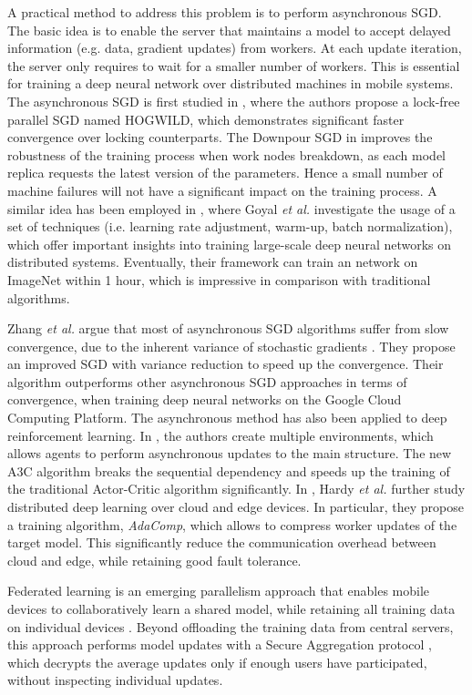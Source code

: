 \documentclass[journal,comsoc,letter]{IEEEtran}
\begin{document}
A practical method to address this problem is to perform asynchronous SGD. The basic idea is to enable the server that maintains a model to accept delayed information (e.g. data, gradient updates) from workers. At each update iteration, the server only requires to wait for a smaller number of workers. This is essential for training a deep neural network over distributed machines in mobile systems. The asynchronous SGD is first studied in \cite{recht2011hogwild}, where the authors propose a lock-free parallel SGD named HOGWILD, which demonstrates significant faster convergence over locking counterparts. The Downpour SGD in \cite{dean2012large} improves the robustness of the training process when work nodes breakdown, as each model replica requests the latest version of the parameters. Hence a small number of machine failures will not have a significant impact on the training process. A similar idea has been employed in \cite{goyal2017accurate}, where Goyal \emph{et al.} investigate the usage of a set of techniques (i.e. learning rate adjustment, warm-up, batch normalization), which offer important insights into training large-scale deep neural networks on distributed systems. Eventually, their framework can train an network on ImageNet within 1 hour, which is impressive in comparison with traditional algorithms.

Zhang \emph{et al.} argue that most of asynchronous SGD algorithms suffer from slow convergence, due to the inherent variance of stochastic gradients \cite{zhang2016asynchronous}. They propose an improved SGD with variance reduction to speed up the convergence. Their algorithm outperforms other asynchronous SGD approaches in terms of convergence, when training deep neural networks on the Google Cloud Computing Platform. The asynchronous method has also been applied to deep reinforcement learning. In \cite{mnih2016asynchronous}, the authors create multiple environments, which allows agents to perform asynchronous updates to the main structure. The new A3C algorithm breaks the sequential dependency and speeds up the training of the traditional Actor-Critic algorithm significantly. In \cite{hardy2017distributed}, Hardy \emph{et al.} further study distributed deep learning over cloud and edge devices. In particular, they propose a training algorithm, \emph{AdaComp}, which allows to compress worker updates of the target model. This significantly reduce the communication overhead between cloud and edge, while retaining good fault tolerance.

Federated learning is an emerging parallelism approach that enables mobile devices to collaboratively learn a shared model, while retaining all training data on individual devices \cite{pmlr-v54-mcmahan17a, mcmahan2017federated}. Beyond offloading the training data from central servers, this approach performs model updates with a Secure Aggregation protocol \cite{cryptoeprint:2017:281}, which decrypts the average updates only if enough users have participated, without inspecting individual updates. 
\end{document}
